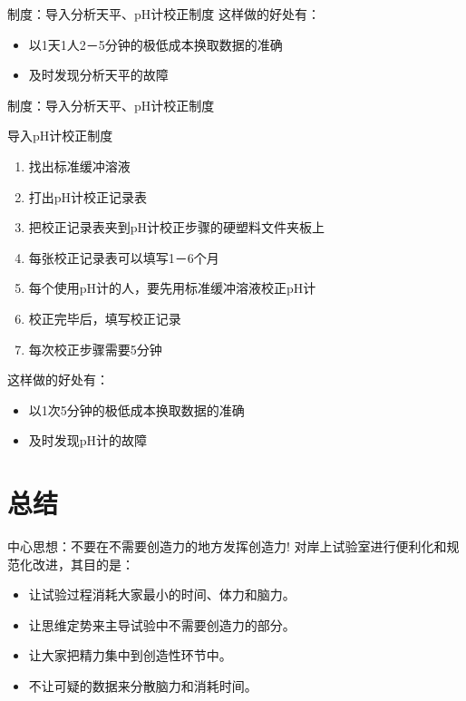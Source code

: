\documentclass[CJKutf8]{beamer}
\newenvironment{SC}{%
  \CJKfamily{gbsn}%
  \CJKtilde
  \CJKnospace}{}
\begin{document}
\begin{CJK}{UTF8}{}
\begin{SC}
\begin{frame}{制度：导入分析天平、pH计校正制度}
  这样做的好处有：
  \begin{itemize}
  \item 以1天1人2－5分钟的极低成本换取数据的准确
  \pause
  \item 及时发现分析天平的故障
  \end{itemize}
\end{frame}

\begin{frame}{制度：导入分析天平、pH计校正制度}
  \begin{block}{导入pH计校正制度}
    \begin{enumerate}
    \item 找出标准缓冲溶液
    \item 打出pH计校正记录表
    \item 把校正记录表夹到pH计校正步骤的硬塑料文件夹板上
    \item 每张校正记录表可以填写1－6个月
    \item 每个使用pH计的人，要先用标准缓冲溶液校正pH计
    \item 校正完毕后，填写校正记录
    \item 每次校正步骤需要5分钟
    \end{enumerate}
  \end{block}
  \pause
  这样做的好处有：
  \begin{itemize}
  \item 以1次5分钟的极低成本换取数据的准确
  \pause
  \item 及时发现pH计的故障
  \end{itemize}
\end{frame}

\section{总结}

\begin{frame}{中心思想：不要在不需要创造力的地方发挥创造力!}
对岸上试验室进行便利化和规范化改进，其目的是：
  \begin{itemize}
  \item
    \alert{让试验过程消耗大家最小的时间、体力和脑力}。
  \pause
  \item
    \alert{让思维定势来主导试验中不需要创造力的部分}。
  \pause
  \item
    \alert{让大家把精力集中到创造性环节中}。
  \pause
  \item
    \alert{不让可疑的数据来分散脑力和消耗时间}。
  \end{itemize}
  

\end{frame}
\end{SC}
\end{CJK}
\end{document}
